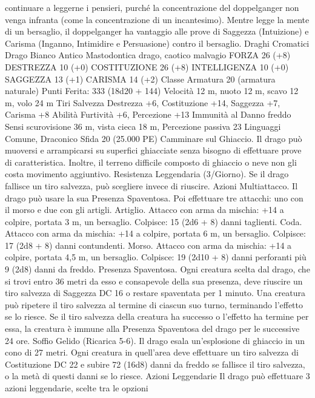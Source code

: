 \begin{multicols}{2}
continuare a leggerne i pensieri, purché la concentrazione del
doppelganger non venga infranta (come la concentrazione di un
incantesimo). Mentre legge la mente di un bersaglio, il
doppelganger ha vantaggio alle prove di Saggezza (Intuizione) e
Carisma (Inganno, Intimidire e Persuasione) contro il bersaglio.
Draghi Cromatici
Drago Bianco Antico
Mastodontica drago, caotico malvagio
FORZA 26 (+8)
DESTREZZA 10 (+0)
COSTITUZIONE 26 (+8)
INTELLIGENZA 10 (+0)
SAGGEZZA 13 (+1)
CARISMA 14 (+2)
Classe Armatura 20 (armatura naturale)
\hspace*{0pt}\hfill{Punti Ferita}: 333 (18d20 + 144)
Velocità 12 m, nuoto 12 m, scavo 12 m, volo 24 m
Tiri Salvezza Destrezza +6, Costituzione +14, Saggezza +7,
Carisma +8
Abilità Furtività +6, Percezione +13
Immunità al Danno freddo
Sensi scurovisione 36 m, vista cieca 18 m, Percezione passiva 23
Linguaggi Comune, Draconico
Sfida 20 (25.000 PE)
Camminare sul Ghiaccio. Il drago può muoversi e arrampicarsi su
superfici ghiacciate senza bisogno di effettuare prove di
caratteristica. Inoltre, il terreno difficile composto di ghiaccio o neve
non gli costa movimento aggiuntivo.
Resistenza Leggendaria (3/Giorno). Se il drago fallisce un tiro
salvezza, può scegliere invece di riuscire.
Azioni
Multiattacco. Il drago può usare la sua Presenza Spaventosa. Poi
effettuare tre attacchi: uno con il morso e due con gli artigli.
Artiglio. Attacco con arma da mischia: +14 a colpire, portata 3
m, un bersaglio.
Colpisce: 15 (2d6 + 8) danni taglienti.
Coda. Attacco con arma da mischia: +14 a colpire, portata 6 m,
un bersaglio.
Colpisce: 17 (2d8 + 8) danni contundenti.
Morso. Attacco con arma da mischia: +14 a colpire, portata 4,5
m, un bersaglio.
Colpisce: 19 (2d10 + 8) danni perforanti più 9 (2d8) danni da freddo.
Presenza Spaventosa. Ogni creatura scelta dal drago, che si trovi
entro 36 metri da esso e consapevole della sua presenza, deve
riuscire un tiro salvezza di Saggezza DC 16 o restare spaventata per
1 minuto. Una creatura può ripetere il tiro salvezza al termine di
ciascun suo turno, terminando l’effetto se lo riesce. Se il tiro salvezza
della creatura ha successo o l’effetto ha termine per essa, la creatura è
immune alla Presenza Spaventosa del drago per le successive 24 ore.
Soffio Gelido (Ricarica 5-6). Il drago esala un’esplosione di ghiaccio
in un cono di 27 metri. Ogni creatura in quell’area deve effettuare un tiro
salvezza di Costituzione DC 22 e subire 72 (16d8) danni da freddo se
fallisce il tiro salvezza, o la metà di questi danni se lo riesce.
Azioni Leggendarie
Il drago può effettuare 3 azioni leggendarie, scelte tra le opzioni

\end{multicols}
